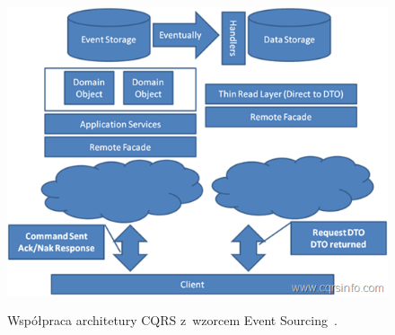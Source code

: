 \begin{figure}[!ht]
 \begin{center}
  \scalebox{0.6}
  {
   \includegraphics{figures/generated_app_type/cqrs_es.png}
  }
 \end{center}
 \caption{Współpraca architetury CQRS z~wzorcem Event Sourcing~\cite{cqrs_info}.}
 \label{fig:cqrs_es}
\end{figure}
